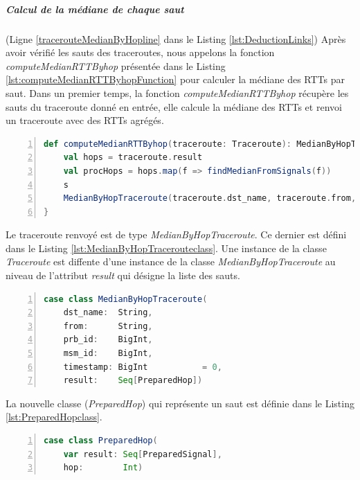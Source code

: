 \subparagraph{Calcul de la médiane de chaque saut} (Ligne \ref{tracerouteMedianByHopline} dans le Listing \ref{lst:DeductionLinks})
Après avoir vérifié les sauts des traceroutes, nous appelons la fonction \textit{computeMedianRTTByhop}  présentée dans le Listing \ref{lst:computeMedianRTTByhopFunction} pour calculer la médiane des RTTs par saut. Dans un premier temps, la fonction \textit{computeMedianRTTByhop} récupère les sauts du traceroute donné en entrée, elle calcule la médiane des RTTs et renvoi un traceroute avec des RTTs agrégés. 

\begin{lstlisting}[language=scala,firstnumber=1, caption={Définition de la fonction computeMedianRTTByhop},label={lst:computeMedianRTTByhopFunction}, basicstyle = \footnotesize,escapechar=|,numbers=left,
stepnumber=1]  
  def computeMedianRTTByhop(traceroute: Traceroute): MedianByHopTraceroute = {
	val hops = traceroute.result
	val procHops = hops.map(f => findMedianFromSignals(f))
	s
	MedianByHopTraceroute(traceroute.dst_name, traceroute.from, traceroute.prb_id, traceroute.msm_id, traceroute.timestamp, procHops)
}
\end{lstlisting}

Le traceroute renvoyé est de type \textit{MedianByHopTraceroute}. Ce dernier est défini dans le Listing \ref{lst:MedianByHopTracerouteclass}. Une instance de la classe \textit{Traceroute} est  diffente  d'une instance de la classe \textit{MedianByHopTraceroute} au niveau de l'attribut \textit{result} qui désigne la liste des sauts.
\begin{lstlisting}[language=scala,firstnumber=1, caption={Définition de la classe MedianByHopTraceroute},label={lst:MedianByHopTracerouteclass}, basicstyle = \footnotesize,escapechar=|,numbers=left,
stepnumber=1] 
case class MedianByHopTraceroute(
	dst_name:  String,
	from:      String,
	prb_id:    BigInt,
	msm_id:    BigInt,
	timestamp: BigInt           = 0,
	result:    Seq[PreparedHop])
\end{lstlisting}

La nouvelle classe (\textit{PreparedHop}) qui représente un saut est définie dans le Listing \ref{lst:PreparedHopclass}.
\begin{lstlisting}[language=scala,firstnumber=1, caption={Définition de la classe PreparedHop},label={lst:PreparedHopclass}, basicstyle = \footnotesize,escapechar=|,numbers=left,
stepnumber=1] 
case class PreparedHop(
	var result: Seq[PreparedSignal],
	hop:        Int)
\end{lstlisting}

